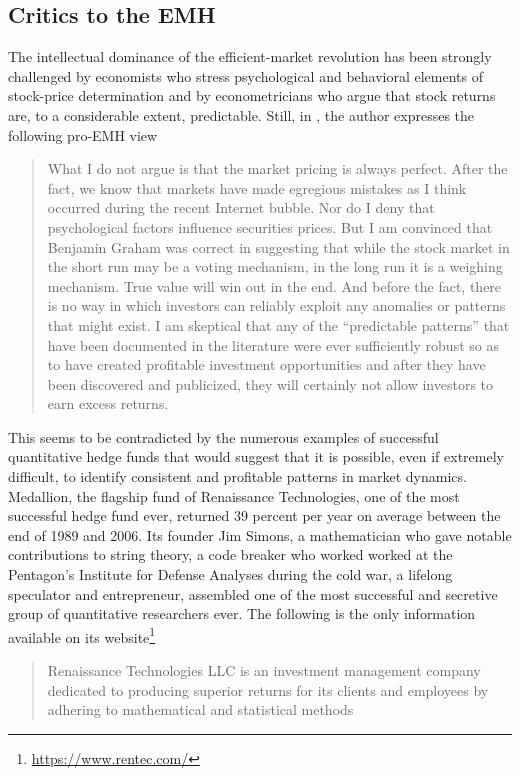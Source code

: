 \subsection{Critics to the EMH}
The intellectual dominance of the efficient-market revolution has been strongly challenged by economists who stress psychological and behavioral elements of stock-price determination and by econometricians who argue that stock returns are, to a considerable extent, predictable. Still, in \cite{malkiel2003efficient}, the author expresses the following pro-EMH view
\begin{quote}
	What I do not argue is that the market pricing is always perfect. After the fact, we
	know that markets have made egregious mistakes as I think occurred during the recent
	Internet bubble. Nor do I deny that psychological factors influence securities prices. But I am convinced that Benjamin Graham was correct in suggesting that while the stock market in the short run may be a voting mechanism, in the long run it is a weighing mechanism. True value will win out in the end. And before the fact, there is no way in which investors can reliably exploit any anomalies or patterns that might exist. I am skeptical that any of the “predictable patterns” that have been documented in the literature were ever sufficiently robust so as to have created profitable investment opportunities and after they have been discovered and publicized, they will certainly not allow investors to earn excess returns. 
\end{quote}
This seems to be contradicted by the numerous examples of successful quantitative hedge funds that would suggest that it is possible, even if extremely difficult, to identify consistent and profitable patterns in market dynamics. Medallion, the flagship fund of Renaissance Technologies, one of the most successful hedge fund ever, returned 39 percent per year on average between the end of 1989 and 2006. Its founder Jim Simons, a mathematician who gave notable contributions to string theory, a code breaker who worked worked at the Pentagon’s Institute for Defense Analyses during the cold war, a lifelong speculator and entrepreneur, assembled one of the most successful and secretive group of quantitative researchers ever. The following is the only information available on its website\footnote{\url{https://www.rentec.com/}} 
\begin{quote}
Renaissance Technologies LLC is an investment management company dedicated to producing superior returns for its clients and employees by adhering to mathematical and statistical methods
\end{quote}
